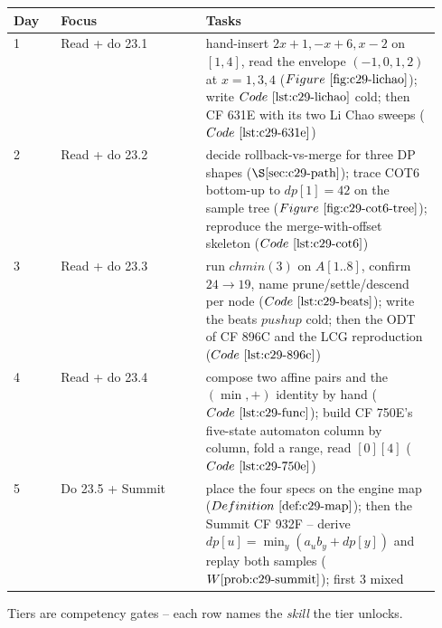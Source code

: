 \begin{center}
\small
\renewcommand{\arraystretch}{1.25}
\begin{tabular}{@{}llp{0.55\linewidth}@{}}
\toprule
\textbf{Day} & \textbf{Focus} & \textbf{Tasks} \\
\midrule
1 & Read + do 23.1 & hand-insert \(2x{+}1,-x{+}6,x{-}2\) on \([1,4]\), read the envelope \((-1,0,1,2)\) at \(x{=}1,3,4\) (\(\figref{c29-lichao}\)); write \(\coderef{c29-lichao}\) cold; then CF 631E with its two Li Chao sweeps (\(\coderef{c29-631e}\)) \\
2 & Read + do 23.2 & decide rollback-vs-merge for three DP shapes (\(\secref{c29-path}\)); trace COT6 bottom-up to \(\mathit{dp}[1]=42\) on the sample tree (\(\figref{c29-cot6-tree}\)); reproduce the merge-with-offset skeleton (\(\coderef{c29-cot6}\)) \\
3 & Read + do 23.3 & run \(\mathit{chmin}(3)\) on \(A[1..8]\), confirm \(24\to19\), name prune/settle/descend per node (\(\coderef{c29-beats}\)); write the beats \(\mathit{pushup}\) cold; then the ODT of CF 896C and the LCG reproduction (\(\coderef{c29-896c}\)) \\
4 & Read + do 23.4 & compose two affine pairs and the \((\min,+)\) identity by hand (\(\coderef{c29-func}\)); build CF 750E's five-state automaton column by column, fold a range, read \([0][4]\) (\(\coderef{c29-750e}\)) \\
5 & Do 23.5 + Summit & place the four specs on the engine map (\(\defref{c29-map}\)); then the Summit CF 932F -- derive \(\mathit{dp}[u]=\min_y(a_u b_y+\mathit{dp}[y])\) and replay both samples (\(\probref{c29-summit}\)); first 3 mixed \\
\bottomrule
\end{tabular}
\end{center}


Tiers are competency gates -- each row names the \emph{skill} the tier unlocks.

